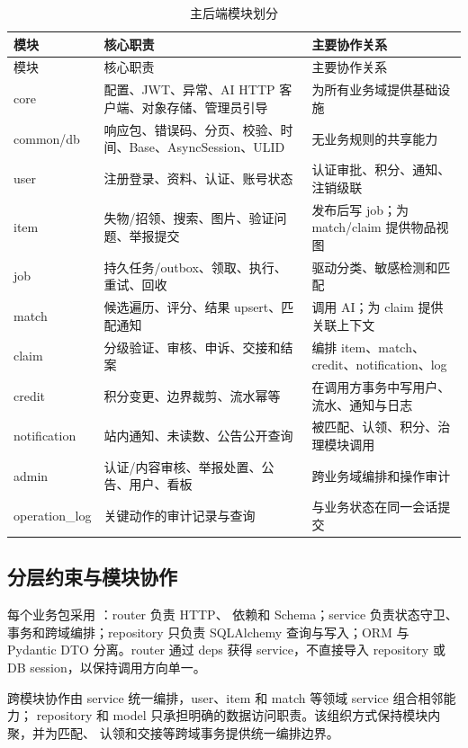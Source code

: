 \begin{longtable}{L{2.2cm} L{5.2cm} L{7.0cm}}
  \caption{主后端模块划分}\label{tab:backend-modules}\\
  \toprule
  模块 & 核心职责 & 主要协作关系 \\
  \midrule
  \endfirsthead
  \toprule
  模块 & 核心职责 & 主要协作关系 \\
  \midrule
  \endhead
  core & 配置、JWT、异常、AI HTTP 客户端、对象存储、管理员引导 & 为所有业务域提供基础设施 \\
  common/db & 响应包、错误码、分页、校验、时间、Base、AsyncSession、ULID & 无业务规则的共享能力 \\
  user & 注册登录、资料、认证、账号状态 & 认证审批、积分、通知、注销级联 \\
  item & 失物/招领、搜索、图片、验证问题、举报提交 & 发布后写 job；为 match/claim 提供物品视图 \\
  job & 持久任务/outbox、领取、执行、重试、回收 & 驱动分类、敏感检测和匹配 \\
  match & 候选遍历、评分、结果 upsert、匹配通知 & 调用 AI；为 claim 提供关联上下文 \\
  claim & 分级验证、审核、申诉、交接和结案 & 编排 item、match、credit、notification、log \\
  credit & 积分变更、边界裁剪、流水幂等 & 在调用方事务中写用户、流水、通知与日志 \\
  notification & 站内通知、未读数、公告公开查询 & 被匹配、认领、积分、治理模块调用 \\
  admin & 认证/内容审核、举报处置、公告、用户、看板 & 跨业务域编排和操作审计 \\
  operation\_\allowbreak log & 关键动作的审计记录与查询 & 与业务状态在同一会话提交 \\
  \bottomrule
\end{longtable}

\subsection{分层约束与模块协作}

每个业务包采用 ：router 负责 HTTP、
依赖和 Schema；service 负责状态守卫、事务和跨域编排；repository 只负责 SQLAlchemy
查询与写入；ORM 与 Pydantic DTO 分离。router 通过 deps 获得 service，不直接导入
repository 或 DB session，以保持调用方向单一。

跨模块协作由 service 统一编排，user、item 和 match 等领域 service 组合相邻能力；
repository 和 model 只承担明确的数据访问职责。该组织方式保持模块内聚，并为匹配、
认领和交接等跨域事务提供统一编排边界。

